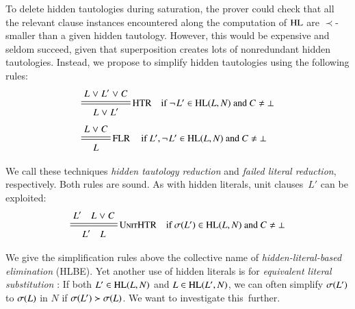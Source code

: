 To delete hidden tautologies during saturation, the prover could check that all
the relevant clause instances encountered along the computation of $\mathrm{HL}$ are
$\prec$-smaller than a given hidden tautology. However, this would be expensive
and seldom succeed, given that superposition creates lots of nonredundant
hidden tautologies. Instead, we propose to simplify hidden tautologies using the
following rules:
%
%
\begin{align*}
   & \namedsimpsc{HTR}{L \cor L' \cor C}{L \cor L'}{\neglit{L'} \in \HL(L, N) \text{~and~} C \not= \bot} \\[.5\jot]
   & \namedsimpsc{\rlap{FLR}\phantom{HTR}}{L \cor C}{L}{L',\neglit{L'} \in \HL(L, N) \text{~and~} C \not= \bot}
\end{align*}
%

%
We call these techniques \emph{hidden tautology reduction} and \emph{failed literal
reduction}, respectively.
%
Both rules are sound.
%
As with hidden literals, unit clauses~$L'$ can be exploited:
\[\namedsimpsc{UnitHTR}{L' \quad L \cor C}{L' \quad L}{\sigmaterm{L'} \in \HL(L,N) \text{~and~} C \not= \bot}
\]

We give the simplification rules above the collective name of
\emph{hidden-literal-based elimination} (HLBE).
Yet another use of hidden literals is for \emph{equivalent literal
substitution} \cite{hjb-2010-cl-elim}: If both $L' \in \mathrm{HL}(L, N)$ and $L
\in \mathrm{HL}(L', N)$, we can often simplify $\sigma(L')$ to $\sigma(L)$ in $N$ if
$\sigma(L') \succ \sigma(L)$. We want to investigate this~further.


